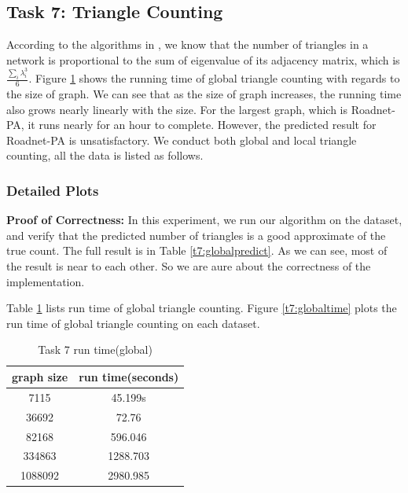 \subsection{Task 7: Triangle Counting}
According to the algorithms in \cite{tsourakakis2008fast}, we know that the number of triangles in a network is proportional to the sum of eigenvalue of its adjacency matrix, which is $\frac{\sum_{i}\lambda_{i}^{3}}{6}$. Figure \ref{t7:timedata} shows the running time of global triangle counting with regards to the size of graph. We can see that as the size of graph increases, the running time also grows nearly linearly with the size. For the largest graph, which is Roadnet-PA, it runs nearly for an hour to complete. However, the predicted result for Roadnet-PA is unsatisfactory. We conduct both global and local triangle counting, all the data is listed as follows.

\subsubsection{Detailed Plots}
{\bf Proof of Correctness: } In this experiment, we run our algorithm on the dataset, and verify that the predicted number of triangles is a good approximate of the true count. The full result is in Table \ref{t7:globalpredict}. As we can see, most of the result is near to each other. So we are aure about the correctness of the implementation. 

Table \ref{t7:timedata} lists run time of global triangle counting. Figure \ref{t7:globaltime} plots the run time of global triangle counting on each dataset.

\begin{table}
\begin{center}
\begin{tabular}{ | c | c | }
    \hline
    graph size & run time(seconds) \\ \hline
    7115 & 45.199s \\ \hline
    36692 & 72.76 \\ \hline
    82168 & 596.046 \\ \hline
    334863 & 1288.703 \\ \hline
    1088092 & 2980.985 \\ \hline
\end{tabular}
\end{center}
\caption{Task 7 run time(global)}
\label{t7:timedata}
\end{table}

